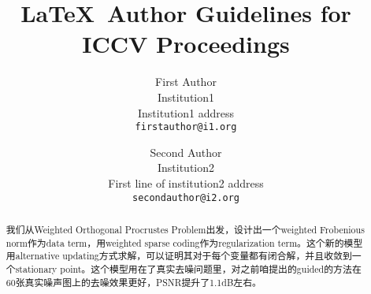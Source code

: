 \documentclass[10pt,twocolumn,letterpaper]{article}
\begin{document}
\title{\LaTeX\ Author Guidelines for ICCV Proceedings}

\author{First Author\\
Institution1\\
Institution1 address\\
{\tt\small firstauthor@i1.org}
\and
Second Author\\
Institution2\\
First line of institution2 address\\
{\tt\small secondauthor@i2.org}
}

\maketitle


\begin{abstract}
我们从Weighted Orthogonal Procrustes Problem出发，设计出一个weighted Frobenious norm作为data term，用weighted sparse coding作为regularization term。这个新的模型用alternative updating方式求解，可以证明其对于每个变量都有闭合解，并且收敛到一个stationary point。这个模型用在了真实去噪问题里，对之前咱提出的guided的方法在60张真实噪声图上的去噪效果更好，PSNR提升了1.1dB左右。
\end{abstract}

\end{document}
